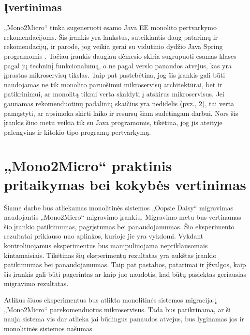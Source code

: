 \documentclass{VUMIFPSbakalaurinis}
\begin{document}
\subsection{Įvertinimas}
„Mono2Micro“ tinka sugeneruoti esamo Java EE monolito pertvarkymo rekomendacijoms. Šis įrankis yra lankstus, suteikiantis daug patarimų ir rekomendacijų, ir parodė, jog veikia gerai su vidutinio dydžio Java Spring programomis \cite{San21}. Tačiau įrankis daugiau dėmesio skiria sugrupuoti esamas klases pagal jų techninį funkcionalumą, o ne pagal verslo panaudos atvejus, kas yra įprastas mikroservisų tikslas. Taip pat pastebėtina, jog šis įrankis gali būti naudojamas ne tik monolito paruošimui mikroservisų architektūrai, bet ir patikrinimui, ar monolitą tikrai verta skaldyti į atskirus mikroservisus. Jei gaunamas rekomenduotinų padalinių skaičius yra nedidelis (pvz., 2), tai verta pamąstyti, ar apsimoka skirti laiko ir resursų šiam sudėtingam darbui. Nors šis įrankis šiuo metu veikia tik su Java programomis, tikėtina, jog jis ateityje palengvins ir kitokio tipo programų pertvarkymą.

\section{„Mono2Micro“ praktinis pritaikymas bei kokybės vertinimas}
Šiame darbe bus atliekamas monolitinės sistemos „Oopsie Daisy“ migravimas naudojantis „Mono2Micro“ migravimo įrankiu. Migravimo metu bus vertinamas šio įrankio patikimumas, pagrįstumas bei panaudojamumas. Šio eksperimento rezultatai priklauso nuo aplinkos, kurioje jie yra vykdomi. Vykdant kontroliuojamus eksperimentus bus manipuliuojama nepriklausomais kintamaisiais. Tikėtinas šių eksperimentų rezultatas yra aukštas įrankio patikimumas bei panaudojamumas. Taip pat pastabos, patarimai ir įžvalgos, kaip šis įrankis gali būti pagerintas ar kaip juo naudotis, kad būtų pasiektas geriausias migravimo rezultatas.

Atlikus šiuos eksperimentus bus atlikta monolitinės sistemos migracija į „Mono2Micro“ parekomenduotus mikroservisus. Tada bus patikrinama, ar ši nauja sistema vis dar atlieka jai būdingus panaudos atvejus, bus lyginamas jos ir monolitinės sistemos našumas.
\end{document}
